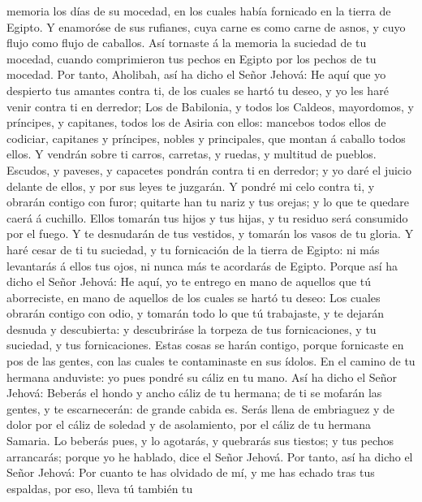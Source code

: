 memoria los días de su mocedad, en los cuales había fornicado en la
tierra de Egipto.  Y enamoróse de sus rufianes, cuya
carne es como carne de asnos, y cuyo flujo como flujo de caballos.
 Así tornaste á la memoria la suciedad de tu mocedad,
cuando comprimieron tus pechos en Egipto por los pechos de tu mocedad.
 Por tanto, Aholibah, así ha dicho el Señor Jehová: He
aquí que yo despierto tus amantes contra ti, de los cuales se hartó tu
deseo, y yo les haré venir contra ti en derredor;  Los de
Babilonia, y todos los Caldeos, mayordomos, y príncipes, y capitanes,
todos los de Asiria con ellos: mancebos todos ellos de codiciar,
capitanes y príncipes, nobles y principales, que montan á caballo todos
ellos.  Y vendrán sobre ti carros, carretas, y ruedas, y
multitud de pueblos. Escudos, y paveses, y capacetes pondrán contra ti
en derredor; y yo daré el juicio delante de ellos, y por sus leyes te
juzgarán.  Y pondré mi celo contra ti, y obrarán contigo
con furor; quitarte han tu nariz y tus orejas; y lo que te quedare caerá
á cuchillo. Ellos tomarán tus hijos y tus hijas, y tu residuo será
consumido por el fuego.  Y te desnudarán de tus vestidos,
y tomarán los vasos de tu gloria.  Y haré cesar de ti tu
suciedad, y tu fornicación de la tierra de Egipto: ni más levantarás á
ellos tus ojos, ni nunca más te acordarás de Egipto. 
Porque así ha dicho el Señor Jehová: He aquí, yo te entrego en mano de
aquellos que tú aborreciste, en mano de aquellos de los cuales se hartó
tu deseo:  Los cuales obrarán contigo con odio, y tomarán
todo lo que tú trabajaste, y te dejarán desnuda y descubierta: y
descubriráse la torpeza de tus fornicaciones, y tu suciedad, y tus
fornicaciones.  Estas cosas se harán contigo, porque
fornicaste en pos de las gentes, con las cuales te contaminaste en sus
ídolos.  En el camino de tu hermana anduviste: yo pues
pondré su cáliz en tu mano.  Así ha dicho el Señor
Jehová: Beberás el hondo y ancho cáliz de tu hermana; de ti se mofarán
las gentes, y te escarnecerán: de grande cabida es. 
Serás llena de embriaguez y de dolor por el cáliz de soledad y de
asolamiento, por el cáliz de tu hermana Samaria.  Lo
beberás pues, y lo agotarás, y quebrarás sus tiestos; y tus pechos
arrancarás; porque yo he hablado, dice el Señor Jehová. 
Por tanto, así ha dicho el Señor Jehová: Por cuanto te has olvidado de
mí, y me has echado tras tus espaldas, por eso, lleva tú también tu
